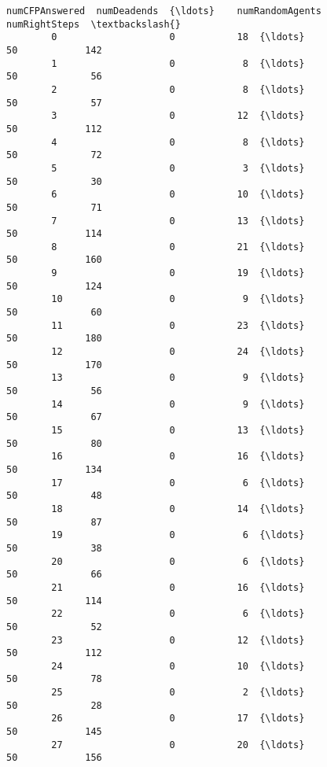 \documentclass[11pt]{article}
\begin{document}
\begin{Verbatim}[commandchars=\\\{\}]
                numCFPAnswered  numDeadends  {\ldots}    numRandomAgents  numRightSteps  \textbackslash{}
        0                    0           18  {\ldots}                 50            142   
        1                    0            8  {\ldots}                 50             56   
        2                    0            8  {\ldots}                 50             57   
        3                    0           12  {\ldots}                 50            112   
        4                    0            8  {\ldots}                 50             72   
        5                    0            3  {\ldots}                 50             30   
        6                    0           10  {\ldots}                 50             71   
        7                    0           13  {\ldots}                 50            114   
        8                    0           21  {\ldots}                 50            160   
        9                    0           19  {\ldots}                 50            124   
        10                   0            9  {\ldots}                 50             60   
        11                   0           23  {\ldots}                 50            180   
        12                   0           24  {\ldots}                 50            170   
        13                   0            9  {\ldots}                 50             56   
        14                   0            9  {\ldots}                 50             67   
        15                   0           13  {\ldots}                 50             80   
        16                   0           16  {\ldots}                 50            134   
        17                   0            6  {\ldots}                 50             48   
        18                   0           14  {\ldots}                 50             87   
        19                   0            6  {\ldots}                 50             38   
        20                   0            6  {\ldots}                 50             66   
        21                   0           16  {\ldots}                 50            114   
        22                   0            6  {\ldots}                 50             52   
        23                   0           12  {\ldots}                 50            112   
        24                   0           10  {\ldots}                 50             78   
        25                   0            2  {\ldots}                 50             28   
        26                   0           17  {\ldots}                 50            145   
        27                   0           20  {\ldots}                 50            156   

\end{Verbatim}
\end{document}
